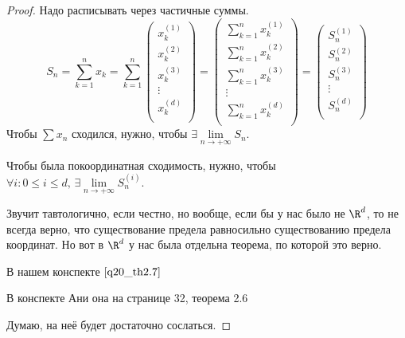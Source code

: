 \begin{properties}
\begin{enumerate}
            \begin{proof}
                Надо расписывать через частичные суммы.
                \[
                    S_n = \sum\limits_{k=1}^{n} x_k = \sum\limits_{k=1}^{n}
                    \left(
                        \begin{array}{c}
                            x_k^{(1)} \\
                            x_k^{(2)} \\
                            x_k^{(3)} \\
                            \vdots \\
                            x_k^{(d)} \\
                        \end{array} 
                    \right) =
                    \left(
                        \begin{array}{c}
                            \sum\limits_{k=1}^{n} x_k^{(1)} \\
                            \sum\limits_{k=1}^{n} x_k^{(2)} \\
                            \sum\limits_{k=1}^{n} x_k^{(3)} \\
                            \vdots \\
                            \sum\limits_{k=1}^{n} x_k^{(d)} \\
                        \end{array}
                    \right) = 
                    \left(
                        \begin{array}{c}
                            S_n^{(1)} \\
                            S_n^{(2)} \\
                            S_n^{(3)} \\
                            \vdots \\
                            S_n^{(d)} \\
                        \end{array}
                    \right)
                \]
                Чтобы $\sum\limits x_n$ сходился, нужно, чтобы $\exists \lim\limits_{n\to +\infty} S_n$. 
                
                Чтобы была покоординатная сходимость, нужно, чтобы $\forall i: 0 \le i \le d, \, \exists \lim\limits_{n\to +\infty} S_{n}^{(i)}$. 

                Звучит тавтологично, если честно, но вообще, если бы у нас было не $\R^d$, то не всегда верно, что существование предела равносильно существованию предела координат. Но вот в $\R^d$ у нас была отдельна теорема, по которой это верно.

                В нашем конспекте $\ref{q20_th2.7}$

                В конспекте Ани она на странице 32, теорема 2.6

                Думаю, на неё будет достаточно сослаться.

            \end{proof}
    \end{enumerate}
\end{properties}




